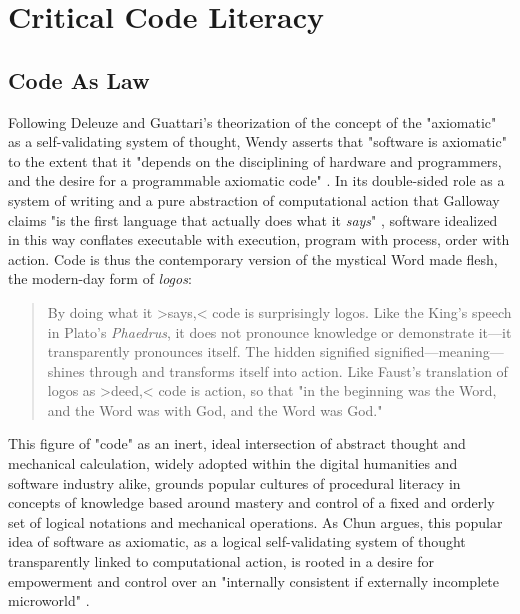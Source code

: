 \section{Critical Code Literacy}
\subsection*{Code As Law}
Following Deleuze and Guattari's theorization of the concept of the "axiomatic" as a self-validating system of thought, Wendy \citeauthor{Chun2011} asserts that "software is axiomatic" to the extent that it "depends on the disciplining of hardware and programmers, and the desire for a programmable axiomatic code" \autocite[49]{Chun2011}. In its double-sided role as a system of writing and a pure abstraction of computational action that Galloway claims "is the first language that actually does what it \emph{says}" \autocite[qtd.~in][22]{Chun2011}, software idealized in this way conflates executable with execution, program with process, order with action. Code is thus the contemporary version of the mystical Word made flesh, the modern-day form of \emph{logos}:
\blockcquote[22]{Chun2011}{
  By doing what it >says,< code is surprisingly logos. Like the King's speech in Plato's \emph{Phaedrus}, it does not pronounce knowledge or demonstrate it---it transparently pronounces itself. The hidden signified signified---meaning---shines through and transforms itself into action. Like Faust's translation of logos as >deed,< code is action, so that "in the beginning was the Word, and the Word was with God, and the Word was God."
}
This figure of "code" as an inert, ideal intersection of abstract thought and mechanical calculation, widely adopted within the digital humanities and software industry alike, grounds popular cultures of procedural literacy in concepts of knowledge based around mastery and control of a fixed and orderly set of logical notations and mechanical operations. As Chun argues, this popular idea of software as axiomatic, as a logical self-validating system of thought transparently linked to computational action, is rooted in a desire for empowerment and control over an "internally consistent if externally incomplete microworld" \autocite[46]{Chun2011}.

